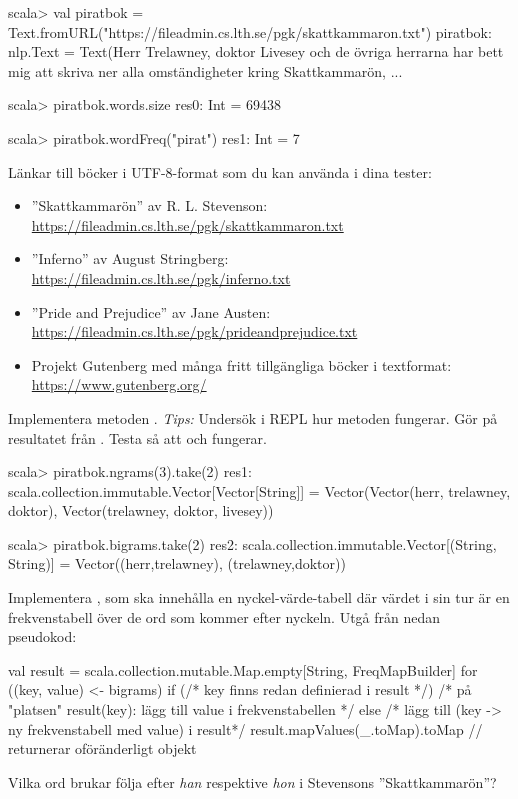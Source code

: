 \begin{REPL}[basicstyle=\color{white}\ttfamily\fontsize{9}{11}\selectfont]
scala> val piratbok = Text.fromURL("https://fileadmin.cs.lth.se/pgk/skattkammaron.txt")
piratbok: nlp.Text = Text(Herr Trelawney, doktor Livesey och de övriga herrarna har bett mig att skriva ner alla omständigheter kring Skattkammarön, ...

scala> piratbok.words.size
res0: Int = 69438

scala> piratbok.wordFreq("pirat")
res1: Int = 7
\end{REPL}
Länkar till böcker i UTF-8-format som du kan använda i dina tester:
\begin{itemize}%
\item ''Skattkammarön'' av R. L. Stevenson: \\\url{https://fileadmin.cs.lth.se/pgk/skattkammaron.txt}
\item ''Inferno'' av August Stringberg: \\\url{https://fileadmin.cs.lth.se/pgk/inferno.txt}
\item ''Pride and Prejudice'' av Jane Austen: \\\url{https://fileadmin.cs.lth.se/pgk/prideandprejudice.txt}
\item Projekt Gutenberg med många fritt tillgängliga böcker i textformat: \\\url{https://www.gutenberg.org/}
\end{itemize}
 


\Task Implementera metoden . \emph{Tips:} Undersök i REPL hur metoden  fungerar. Gör  på resultatet från . Testa så att  och  fungerar.
\begin{REPL}
scala> piratbok.ngrams(3).take(2)
res1: scala.collection.immutable.Vector[Vector[String]] = 
Vector(Vector(herr, trelawney, doktor), Vector(trelawney, doktor, livesey))

scala> piratbok.bigrams.take(2)
res2: scala.collection.immutable.Vector[(String, String)] = 
Vector((herr,trelawney), (trelawney,doktor))
\end{REPL}

\Task Implementera , som ska innehålla en nyckel-värde-tabell där värdet i sin tur är en frekvenstabell över de ord som kommer efter nyckeln. Utgå från nedan pseudokod: 
\begin{Code}
val result = scala.collection.mutable.Map.empty[String, FreqMapBuilder]
for ((key, value) <- bigrams) { 
  if (/* key finns redan definierad i result */)
    /* på "platsen" result(key): lägg till value i frekvenstabellen */
  else 
    /* lägg till (key -> ny frekvenstabell med value) i result*/ 
}
result.mapValues(_.toMap).toMap // returnerar oföränderligt objekt
\end{Code}
\Subtask Vilka ord brukar följa efter \emph{han} respektive \emph{hon} i Stevensons ''Skattkammarön''?

